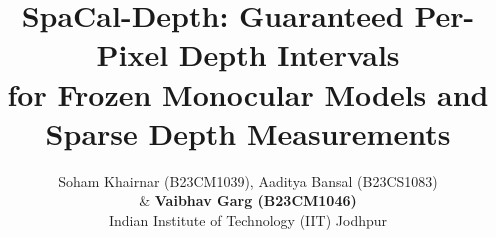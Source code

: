 \documentclass{article}
\title{SpaCal-Depth: Guaranteed Per-Pixel Depth Intervals\\for Frozen Monocular Models and Sparse Depth Measurements}
\author{%
  Soham Khairnar (B23CM1039), Aaditya Bansal (B23CS1083) \\
  \& \textbf{Vaibhav Garg (B23CM1046)} \\
  Indian Institute of Technology (IIT) Jodhpur \\
}
\begin{document}
\maketitle









{\small


}

\appendix

\end{document}
